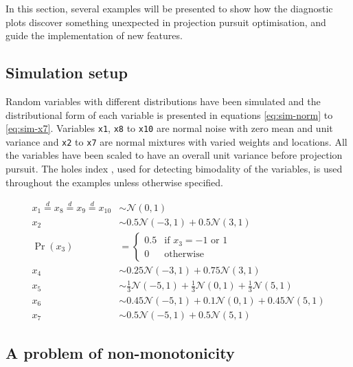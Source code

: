 In this section, several examples will be presented to show how the
diagnostic plots discover something unexpected in projection pursuit
optimisation, and guide the implementation of new features.

\hypertarget{simulation-setup}{%
\subsection{Simulation setup}\label{simulation-setup}}

Random variables with different distributions have been simulated and
the distributional form of each variable is presented in equations
\ref{eq:sim-norm} to \ref{eq:sim-x7}. Variables \texttt{x1}, \texttt{x8}
to \texttt{x10} are normal noise with zero mean and unit variance and
\texttt{x2} to \texttt{x7} are normal mixtures with varied weights and
locations. All the variables have been scaled to have an overall unit
variance before projection pursuit. The holes index
\citep{cook2008grand}, used for detecting bimodality of the variables,
is used throughout the examples unless otherwise specified.

\begin{align}
x_1 \overset{d}{=} x_8 \overset{d}{=} x_9 \overset{d}{=} x_{10}& \sim \mathcal{N}(0, 1) \label{eq:sim-norm} \\
x_2 &\sim 0.5 \mathcal{N}(-3, 1) + 0.5 \mathcal{N}(3, 1)\label{eq:sim-x2}\\
\Pr(x_3) &= 
\begin{cases}
0.5 & \text{if $x_3 = -1$ or $1$}\\
0 & \text{otherwise}
\end{cases}\label{eq:sim-x3}\\
x_4 &\sim 0.25 \mathcal{N}(-3, 1) + 0.75 \mathcal{N}(3, 1) \label{eq:sim-x4}\\
x_5 &\sim \frac{1}{3} \mathcal{N}(-5, 1) + \frac{1}{3} \mathcal{N}(0, 1) + \frac{1}{3} \mathcal{N}(5, 1)\label{eq:sim-x5}\\
x_6 &\sim 0.45 \mathcal{N}(-5, 1) + 0.1 \mathcal{N}(0, 1) + 0.45 \mathcal{N}(5, 1)\label{eq:sim-x6}\\
x_7 &\sim 0.5 \mathcal{N}(-5, 1) + 0.5 \mathcal{N}(5, 1) 
\label{eq:sim-x7}
\end{align}

\hypertarget{monotonic}{%
\subsection{A problem of non-monotonicity}\label{monotonic}}

